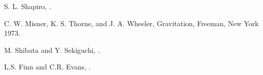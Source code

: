 




S. L. Shapiro, .

C. W. Misner, K. S. Thorne, and J. A. Wheeler, Gravitation, Freeman, New York 1973.

M. Shibata and Y. Sekiguchi,  .

L.S. Finn and C.R. Evans, .








